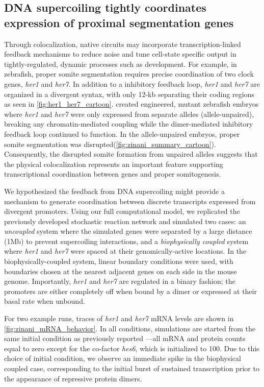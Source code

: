 \documentclass[11pt]{article}
\begin{document}
\subsection{DNA supercoiling tightly coordinates expression of proximal segmentation genes}
Through colocalization, native circuits may incorporate transcription-linked feedback mechanisms to reduce noise and tune cell-state specific output in tightly-regulated, dynamic processes such as development. For example, in zebrafish, proper somite segmentation requires precise coordination of two clock genes, \textit{her1} and \textit{her7}. In addition to a inhibitory feedback loop, \textit{her1} and \textit{her7} are organized in a divergent syntax, with only 12-kb separating their coding regions as seen in \cref{fig:her1_her7_cartoon}. \Textcite{zinaniPairingSegmentationClock2021} created engineered, mutant zebrafish embryos where \emph{her1} and \emph{her7} were only expressed from separate alleles (allele-unpaired), breaking any chromatin-mediated coupling while the dimer-mediated inhibitory feedback loop continued to function. In the allele-unpaired embryos, proper somite segmentation was disrupted(\cref{fig:zinani_summary_cartoon}). Consequently, the disrupted somite formation from unpaired alleles suggests that the physical colocalization represents an important feature supporting transcriptional coordination between genes and proper somitogenesis.

We hypothesized the feedback from DNA supercoiling might provide a mechanism to generate coordination between discrete transcripts expressed from divergent promoters. Using our full computational model, we replicated the previously developed stochastic reaction network and simulated two cases: an \emph{uncoupled} system where the simulated genes were separated by a large distance (1Mb) to prevent supercoiling interactions, and a \emph{biophysically coupled} system where \textit{her1} and \textit{her7} were spaced at their genomically-active locations. In the biophysically-coupled system, linear boundary conditions were used, with boundaries chosen at the nearest adjacent genes on each side in the mouse genome. Importantly, \textit{her1} and \textit{her7} are regulated in a binary fashion; the promoters are either completely off when bound by a dimer or expressed at their basal rate when unbound.

For two example runs, traces of \textit{her1} and \textit{her7} mRNA levels are shown in \cref{fig:zinani_mRNA_behavior}. In all conditions, simulations are started from the same initial condition as previously reported \parencite{zinaniPairingSegmentationClock2021}---all mRNA and protein counts equal to zero except for the co-factor \textit{hes6}, which is initialized to 100. Due to this choice of initial condition, we observe an immediate spike in the biophysical coupled case, corresponding to the initial burst of sustained transcription prior to the appearance of repressive protein dimers.
\end{document}
